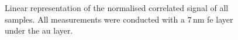 \documentclass[a4paper,12pt,twoside]{article}
\begin{document}
	\begin{figure}[H]
		\caption{Linear representation of the normalised correlated signal of all samples. All measurements were conducted with a $7\,\mathrm{nm}$ \gls{fe} layer under the \gls{au} layer.}
    		\label{shifted}
	\end{figure}
\end{document}
